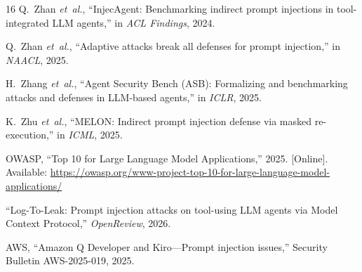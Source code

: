 \documentclass[conference]{IEEEtran}
\begin{document}
\begin{thebibliography}{16}
Q.~Zhan \emph{et~al.}, ``InjecAgent: Benchmarking indirect prompt injections in tool-integrated LLM agents,'' in \emph{ACL Findings}, 2024.

Q.~Zhan \emph{et~al.}, ``Adaptive attacks break all defenses for prompt injection,'' in \emph{NAACL}, 2025.

H.~Zhang \emph{et~al.}, ``Agent Security Bench (ASB): Formalizing and benchmarking attacks and defenses in LLM-based agents,'' in \emph{ICLR}, 2025.

K.~Zhu \emph{et~al.}, ``MELON: Indirect prompt injection defense via masked re-execution,'' in \emph{ICML}, 2025.

OWASP, ``Top 10 for Large Language Model Applications,'' 2025. [Online]. Available: \url{https://owasp.org/www-project-top-10-for-large-language-model-applications/}

``Log-To-Leak: Prompt injection attacks on tool-using LLM agents via Model Context Protocol,'' \emph{OpenReview}, 2026.

AWS, ``Amazon Q Developer and Kiro---Prompt injection issues,'' Security Bulletin AWS-2025-019, 2025.

\end{thebibliography}
\end{document}
